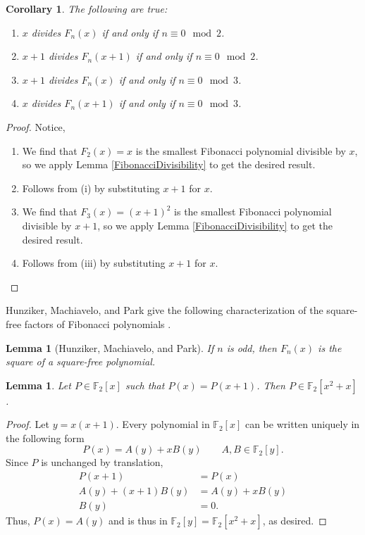 \documentclass[a4paper]{article}
\newtheorem{lemma}[theorem]{Lemma}
\newtheorem{corollary}[theorem]{Corollary}
\newcommand{\F}{\mathbb{F}}
\begin{document}
	\begin{corollary}\label{Threeven}
		The following are true:
		\begin{enumerate}[label=(\roman*)]
			\item $x$ divides $F_n(x)$ if and only if $n \equiv 0 \mod 2$.
			\item $x+1$ divides $F_n(x+1)$ if and only if $n \equiv 0 \mod 2$.
			\item $x+1$ divides $F_n(x)$ if and only if $n \equiv 0 \mod 3$.
			\item $x$ divides $F_n(x+1)$ if and only if $n \equiv 0 \mod 3$.
		\end{enumerate}
	\end{corollary}
	\begin{proof}
		Notice,
		\begin{enumerate}[label=(\roman*)]
			\item We find that $F_2(x) = x$ is the smallest Fibonacci polynomial divisible by $x$, so we apply Lemma \ref{FibonacciDivisibility} to get the desired result.
			\item Follows from (i) by substituting $x+1$ for $x$.
			\item We find that $F_3(x) = (x+1)^2$ is the smallest Fibonacci polynomial divisible by $x+1$, so we apply Lemma \ref{FibonacciDivisibility} to get the desired result.
			\item Follows from (iii) by substituting $x+1$ for $x$.
		\end{enumerate}
	\end{proof}
	
	Hunziker, Machiavelo, and Park give the following characterization of the square-free factors of Fibonacci polynomials \cite[Proposition 2.11]{HUNZIKER2004465}.
	\begin{lemma}[Hunziker, Machiavelo, and Park]\label{SquareSquareFree}
		If $n$ is odd, then $F_n(x)$ is the square of a square-free polynomial.
	\end{lemma}

	\begin{lemma}\label{translationInvarianceField}
		Let $P \in \F_2[x]$ such that $P(x) = P(x+1)$.
		Then $P \in \F_2[x^2 + x]$.
	\end{lemma}
	\begin{proof}
		Let $y = x(x+1)$.
		Every polynomial in $\F_2[x]$ can be written uniquely in the following form
		\begin{equation*}
			P(x) = A(y) + xB(y) \qquad A,B \in \F_2[y].
		\end{equation*}
		Since $P$ is unchanged by translation,
		\begin{align*}
			P(x+1) &= P(x) \\
			A(y) + (x+1)B(y) &= A(y) + xB(y) \\
			B(y) &= 0.
		\end{align*}
		Thus, $P(x) = A(y)$ and is thus in $\F_2[y] = \F_2[x^2 + x]$, as desired.
	\end{proof}
\end{document}
